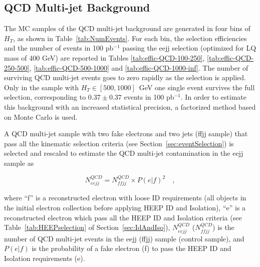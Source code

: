
\clearpage

\subsection{QCD Multi-jet Background} \label{sec:QCDBackground}


The MC samples of the QCD multi-jet background are generated in four bins of $H_T$, as shown in Table~\ref{tab:NumEvents}.
For each bin, the selection efficiencies and the number of events in 100 pb$^{-1}$ passing the eejj selection 
(optimized for LQ mass of 400 GeV) are reported in Tables 
\ref{tab:effic-QCD-100-250},
\ref{tab:effic-QCD-250-500},
\ref{tab:effic-QCD-500-1000} and
\ref{tab:effic-QCD-1000-inf}. 
The number of surviving QCD multi-jet events goes to zero rapidly as the selection is applied. 
Only in the sample with $H_T\in[500,1000]$~GeV one single event survives the full selection, corresponding
to $0.37\pm 0.37$ events in 100 pb$^{-1}$.
In order to estimate this background with an increased statistical precision, a factorized 
method based on Monte Carlo is used.

A QCD multi-jet sample with two fake electrons and two jets (ffjj sample)
that pass all the kinematic selection criteria (see Section~\ref{sec:eventSelection}) is selected and 
rescaled to estimate the QCD multi-jet contamination in the eejj sample as

%
\begin{equation} \label{QCDRescaling}
N_{eejj}^{QCD} = N_{ffjj}^{QCD} \times {P(e|f)}^2 \quad , 
\end{equation}
%

where ``f'' is a reconstructed electron with loose ID requirements (all objects in the initial electron collection 
before applying HEEP ID and Isolation), 
``e'' is a reconstructed electron which pass all the HEEP ID and Isolation criteria (see Table~\ref{tab:HEEPselection} 
of Section~\ref{sec:IdAndIso}), 
$N_{eejj}^{QCD}$ ($N_{ffjj}^{QCD}$) is the number of QCD multi-jet events in the eejj (ffjj) sample (control sample), 
and $P(e|f)$ is the probability of a fake electron (f) to pass the HEEP ID and Isolation requirements (e).

